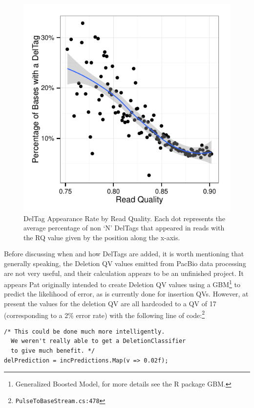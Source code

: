\documentclass[fleqn,10pt]{SelfArx} %
\begin{document}
\begin{figure}[ht]\centering 
\includegraphics[width=\linewidth]{TagRateByRQ}
\caption{DelTag Appearance Rate by Read Quality.  Each dot represents the average percentage of non `N' DelTags that appeared in reads with the RQ value given by the position along the x-axis. }
\label{fig:RateByRQ}
\end{figure}


Before discussing when and how DelTags are added, it is worth mentioning that generally speaking, the Deletion QV values emitted from PacBio data processing are not very useful, and their calculation appears to be an unfinished project.  It appears Pat originally intended to create Deletion QV values using a GBM\footnote{Generalized Boosted Model, for more details see the R package GBM.} to predict the likelihood of error, as is currently done for insertion QVs.  However, at present the values for the deletion QV are all hardcoded to a QV of 17 (corresponding to a 2\% error rate) with the following line of code:\footnote{\texttt{PulseToBaseStream.cs:478}}

\lstset{style=sharpc}
\begin{lstlisting}[frame=single]
/* This could be done much more intelligently.
  We weren't really able to get a DeletionClassifier
  to give much benefit. */
delPrediction = incPredictions.Map(v => 0.02f);
\end{lstlisting}
\end{document}
